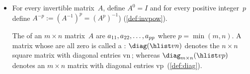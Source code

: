 \begin{itemize}
\itemme If \(A\) is an {invertible} matrix, then its  is unique, and denoted by~\(A^{-1}\) (\cref{thm:uninv}).

\itemhi For every \(2\times2\) matrix \(A=\begin{bmat} a&b\\c&d \end{bmat}\), the matrix~\(A\) is {invertible} if and only if the  \(ad-bc\neq0\) (\cref{thm:2x2det}), in which case
\begin{equation*}
A^{-1}=\frac1{ad-bc}\begin{bmatrix} d&-b\\-c&a \end{bmatrix}.
\end{equation*}

\itemme If a matrix~\(A\) is {invertible}, then  \(A\xv=\bv\) has the {unique solution} \(\xv=A^{-1}\bv\) for every~\(\bv\) (\cref{thm:invuniqsol}).

\itemme For all invertible matrices~\(A\) and~\(B\), the inverse has the properties (\cref{thm:invprop}):
\begin{itemize}
\item  matrix \(A^{-1}\) is invertible and \((A^{-1})^{-1}=A\)\,;
\item if scalar \(c\neq0\)\,, then matrix~\(cA\) is invertible and \((cA)^{-1}=\frac1cA^{-1}\);
\item matrix \(AB\) is invertible and \((AB)^{-1}=B^{-1}A^{-1}\) (remember the reversed order);
\item matrix \(\tr A\) is invertible and \((\tr A)^{-1}=\tr{(A^{-1})}\);
\item matrices \(A^p\) are invertible for all \(p=1,2,3,\ldots\) and \((A^p)^{-1}=(A^{-1})^p\).
\end{itemize}

\item For every {invertible} matrix~\(A\), define \(A^0=I\) and for every positive integer~\(p\) define \(A^{-p}:=(A^{-1})^p=(A^p)^{-1}\)) (\cref{def:invpow}).

\itemhi The  of an \(m\times n\) matrix~\(A\) are  \(\sloppy a_{11}, a_{22}, \ldots, a_{pp}\) where \(p=\min(m,n)\).
A matrix whose  are all zero is called a : \(\diag(\hlist vn)\) denotes the \(n\times n\) square matrix with diagonal entries \hlist vn\,; whereas \(\diag_{m\times n}(\hlist vp)\) denotes an \(m\times n\) matrix with diagonal entries \hlist vp\ (\cref{def:diag}).


\end{itemize}
